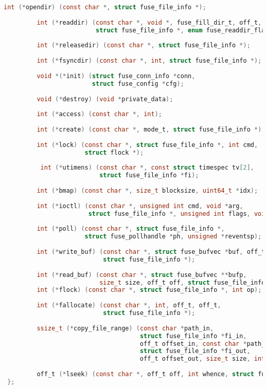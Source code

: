 \documentclass[main]{subfiles}
\begin{document}
\begin{lstlisting}[label=fuse_operations,caption=fuseの命令一覧,language=c]
         int (*opendir) (const char *, struct fuse_file_info *);
 
         int (*readdir) (const char *, void *, fuse_fill_dir_t, off_t,
                         struct fuse_file_info *, enum fuse_readdir_flags);
 
         int (*releasedir) (const char *, struct fuse_file_info *);
 
         int (*fsyncdir) (const char *, int, struct fuse_file_info *);
 
         void *(*init) (struct fuse_conn_info *conn,
                        struct fuse_config *cfg);
 
         void (*destroy) (void *private_data);
 
         int (*access) (const char *, int);
 
         int (*create) (const char *, mode_t, struct fuse_file_info *);
 
         int (*lock) (const char *, struct fuse_file_info *, int cmd,
                      struct flock *);
 
          int (*utimens) (const char *, const struct timespec tv[2],
                          struct fuse_file_info *fi);
 
         int (*bmap) (const char *, size_t blocksize, uint64_t *idx);
 
         int (*ioctl) (const char *, unsigned int cmd, void *arg,
                       struct fuse_file_info *, unsigned int flags, void *data);
 
         int (*poll) (const char *, struct fuse_file_info *,
                      struct fuse_pollhandle *ph, unsigned *reventsp);
 
         int (*write_buf) (const char *, struct fuse_bufvec *buf, off_t off,
                           struct fuse_file_info *);
 
         int (*read_buf) (const char *, struct fuse_bufvec **bufp,
                          size_t size, off_t off, struct fuse_file_info *);
         int (*flock) (const char *, struct fuse_file_info *, int op);
 
         int (*fallocate) (const char *, int, off_t, off_t,
                           struct fuse_file_info *);
 
         ssize_t (*copy_file_range) (const char *path_in,
                                     struct fuse_file_info *fi_in,
                                     off_t offset_in, const char *path_out,
                                     struct fuse_file_info *fi_out,
                                     off_t offset_out, size_t size, int flags);
 
         off_t (*lseek) (const char *, off_t off, int whence, struct fuse_file_info *);
 };
\end{lstlisting}
\end{document}
